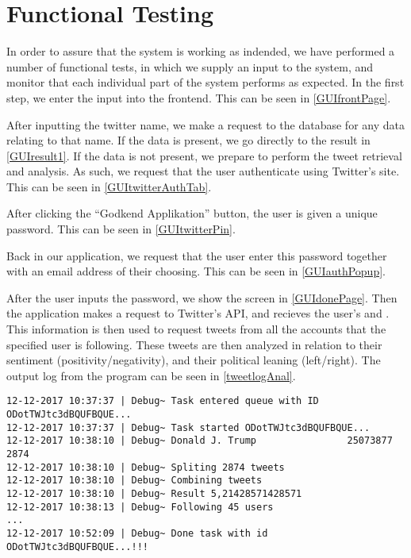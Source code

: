 \section{Functional Testing}

In order to assure that the system is working as indended, we have
performed a number of functional tests, in which we supply an input to the system, and
monitor that each individual part of the system performs as expected. In the
first step, we enter the input into the frontend. This can be seen in
\autoref{GUIfrontPage}.\nl 

After inputting the twitter name, we make a request to the database for any data
relating to that name. If the data is present, we go directly to the result in
\autoref{GUIresult1}. If the data is not present, we prepare to perform the
tweet retrieval and analysis. As such, we request that the user authenticate using
Twitter's site. This can be seen in \autoref{GUItwitterAuthTab}.\nl

After clicking the ``Godkend Applikation'' button, the user is given a unique
password. This can be seen in \autoref{GUItwitterPin}.\nl


Back in our application, we request that the user enter this password
together with an email address of their choosing. This can be seen in
\autoref{GUIauthPopup}.\nl


After the user inputs the password, we show the screen in \autoref{GUIdonePage}.
Then the application makes a request to Twitter's API, and recieves the user's
 and . This information is
then used to request tweets from all the accounts that the specified user is
following. These tweets are then analyzed in relation to their sentiment
(positivity/negativity), and their political leaning (left/right). The output
log from the program can be seen in \autoref{tweetlogAnal}. \nl

\begin{minipage}[H]{\linewidth}
\begin{lstlisting}[caption = Log from tweet retrieval and analysis, label = tweetlogAnal] 
12-12-2017 10:37:37 | Debug~ Task entered queue with ID ODotTWJtc3dBQUFBQUE...
12-12-2017 10:37:37 | Debug~ Task started ODotTWJtc3dBQUFBQUE...
12-12-2017 10:38:10 | Debug~ Donald J. Trump                25073877             2874       
12-12-2017 10:38:10 | Debug~ Spliting 2874 tweets
12-12-2017 10:38:10 | Debug~ Combining tweets
12-12-2017 10:38:10 | Debug~ Result 5,21428571428571
12-12-2017 10:38:13 | Debug~ Following 45 users
...
12-12-2017 10:52:09 | Debug~ Done task with id ODotTWJtc3dBQUFBQUE...!!!
\end{lstlisting}
\end{minipage}

